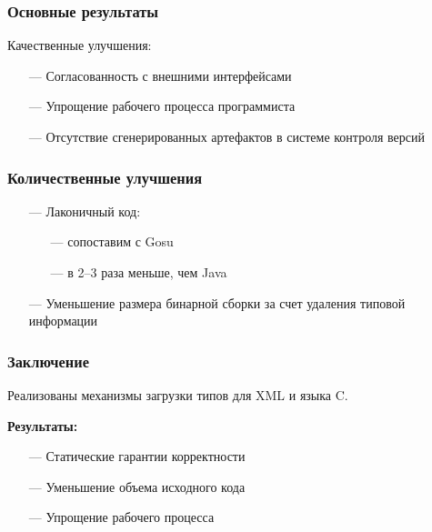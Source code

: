 \documentclass[12pt]{beamer}
\begin{document}
\begin{frame}\frametitle{Основные результаты}
    Качественные улучшения:
    \begin{itemize}
        \item[---] Согласованность с внешними интерфейсами
        \item[---] Упрощение рабочего процесса программиста
        \item[---] Отсутствие сгенерированных артефактов в системе контроля версий
    \end{itemize}
\end{frame}

\begin{frame}\frametitle{Количественные улучшения}
    \begin{itemize}
        \item[---] Лаконичный код:
            \begin{itemize}
                \item[---] сопоставим с Gosu
                \item[---] в 2--3 раза меньше, чем Java
            \end{itemize}
        \item[---] Уменьшение размера бинарной сборки за счет удаления типовой информации
    \end{itemize}
\end{frame}

\begin{frame}\frametitle{Заключение}
Реализованы механизмы загрузки типов для XML и языка C.

\textbf{Результаты:}
    \begin{itemize}
        \item[---] Статические гарантии корректности
        \item[---] Уменьшение объема исходного кода
        \item[---] Упрощение рабочего процесса
    \end{itemize}
\end{frame}
\end{document}
